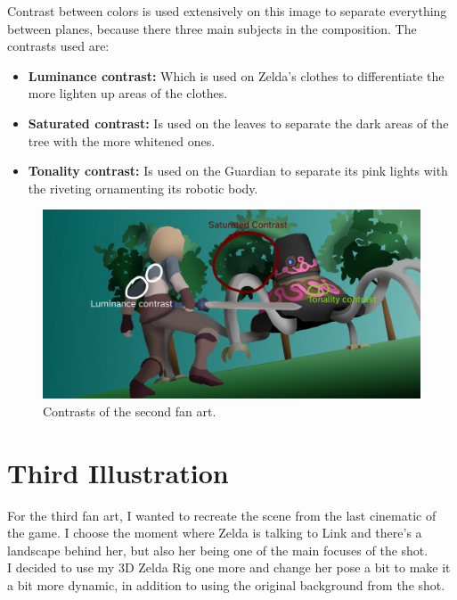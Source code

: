 \documentclass{cup-pan}
\begin{document}
            Contrast between colors is used extensively on this image to separate everything between planes, because there three main subjects in the composition.
            The contrasts used are:
            \begin{itemize}
                \item \textbf{Luminance contrast:} Which is used on Zelda's clothes to differentiate the more lighten up areas of the clothes. 
                \item \textbf{Saturated contrast:} Is used on the leaves to separate the dark areas of the tree with the more whitened ones.
                \item \textbf{Tonality contrast:} Is used on the Guardian to separate its pink lights with the riveting ornamenting its robotic body.  
            \end{itemize}
            \begin{figure}[H]
                \includegraphics[width=\textwidth]{Imagenes/Fanart2/Analysis/contraste.png}
                \caption{Contrasts of the second fan art.}
            \end{figure}

\newpage
\newpage
\section{Third Illustration}
For the third fan art, I wanted to recreate the scene from the last cinematic of the game. I choose the moment where Zelda is talking to Link and there's a landscape behind her, but also her being one of the main focuses of the shot.\\

I decided to use my 3D Zelda Rig one more and change her pose a bit to make it a bit more dynamic, in addition to using the original background from the shot.\\
\end{document}
